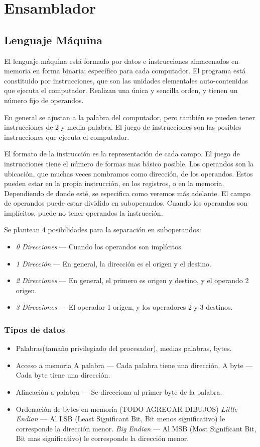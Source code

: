 \documentclass[a4paper,11pt,spanish]{report}
\begin{document}
\chapter{Ensamblador}
\section{Lenguaje Máquina}

El lenguaje máquina está formado por datos e instrucciones almacenados en memoria en forma binaria; específico para cada computador. El programa está constituido por instrucciones, que son las unidades elementales auto-contenidas que ejecuta el computador. Realizan una única y sencilla orden, y tienen un número fijo de operandos.

En general se ajustan a la palabra del computador, pero también se pueden tener instrucciones de 2 y media palabra. El juego de instrucciones son las posibles instrucciones que ejecuta el computador.
 
El formato de la instrucción es la representación de cada campo. El juego de instrucciones tiene el número de formas mas básico posible. Los operandos son la ubicación, que muchas veces nombramos como dirección, de los operandos. Estos pueden estar en la propia instrucción, en los registros, o en la memoria. Dependiendo de donde esté, se especifica como veremos más adelante. El campo de operandos puede estar dividido en suboperandos. Cuando los operandos son implícitos, puede no tener operandos la instrucción.

Se plantean 4 posibilidades para la separación en suboperandos:
\begin{itemize}
\item \emph{0 Direcciones} --- Cuando los operandos son implícitos.
\item \emph{1 Dirección} --- En general, la dirección es el origen y el destino.
\item \emph{2 Direcciones} --- En general, el primero es origen y destino, y el operando 2 origen.
\item \emph{3 Direcciones} --- El operador 1 origen, y los operadores 2 y 3 destinos.
\end{itemize}

\subsection{Tipos de datos}
\begin{itemize}
\item Palabras(tamaño privilegiado del procesador), medias palabras, bytes.
\item Acceso a memoria 
\subitem A palabra --- Cada palabra tiene una dirección.
\subitem A byte --- Cada byte tiene una dirección.
\item Alineación a palabra --- Se direcciona al primer byte de la palabra.
\item Ordenación de bytes en memoria
(TODO AGREGAR DIBUJOS)
\subitem \emph{Little Endian} --- Al LSB (Least Significant Bit, Bit menos significativo) le corresponde la dirección menor.
\subitem \emph{Big Endian} --- Al MSB (Most Significant Bit, Bit mas significativo) le corresponde la dirección menor.
\end{itemize}
\end{document}
